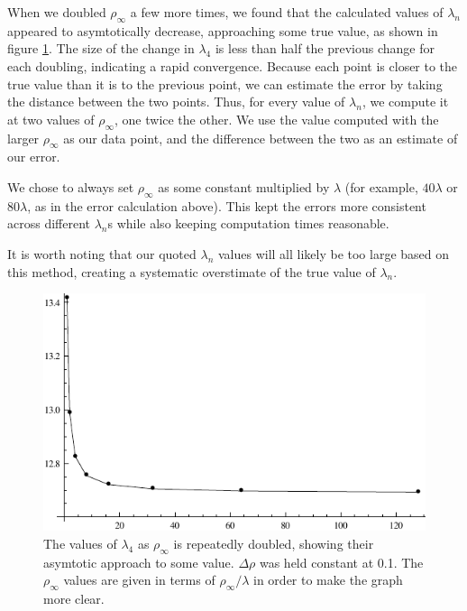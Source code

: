 \documentclass[12pt,twoside]{reedthesis}
\begin{document}
When we doubled $\rho_{\infty}$ a few more times, we found that the calculated values of $\lambda_{n}$ appeared to asymtotically decrease, approaching some true value, as shown in figure \ref{fig:asymtote}. The size of the change in $\lambda_4$ is less than half the previous change for each doubling, indicating a rapid convergence. Because each point is closer to the true value than it is to the previous point, we can estimate the error by taking the distance between the two points. Thus, for every value of $\lambda_n$, we compute it at two values of $\rho_{\infty}$, one twice the other. We use the value computed with the larger $\rho_{\infty}$ as our data point, and the difference between the two as an estimate of our error.

We chose to always set $\rho_{\infty}$ as some constant multiplied by $\lambda$ (for example, $40 \lambda$ or $80 \lambda$, as in the error calculation above). This kept the errors more consistent across different $\lambda_n$s while also keeping computation times reasonable.

It is worth noting that our quoted $\lambda_n$ values will all likely be too large based on this method, creating a systematic overstimate of the true value of $\lambda_n$.
 
\begin{figure}[h]
\centering
\includegraphics{Figures/asymtote}
\caption[Asymtotic behavior of $\lambda_{4} (\rho_{\infty})$]{The values of $\lambda_{4}$ as $\rho_{\infty}$ is repeatedly doubled, showing their asymtotic approach to some value. $\Delta \rho$ was held constant at 0.1. The $\rho_{\infty}$ values are given in terms of $\rho_{\infty}/\lambda$ in order to make the graph more clear.}
\label{fig:asymtote}
\end{figure} 
\end{document}
